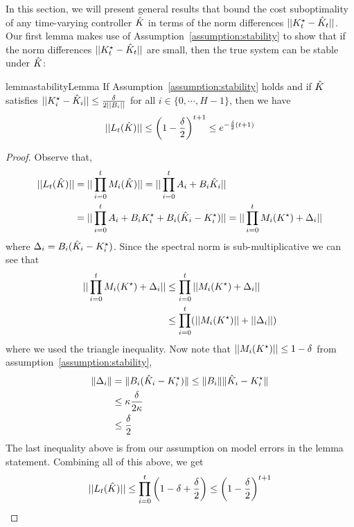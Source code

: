 In this section, we will present general results that bound the cost suboptimality of
any time-varying controller $\hat{K}$ in terms of the norm differences
$||K^\star_{t} - \hat{K}_{t}||$. Our first lemma makes use of
Assumption~\ref{assumption:stability} to show that if the norm differences
$||K^\star_{t} - \hat{K}_{t}||$ are small, then the true system can be stable under
$\hat{K}$:
\begin{restatable}{lemma}{stabilityLemma}
  \label{lemma:stability}
  If Assumption~\ref{assumption:stability} holds and if $\hat{K}$ satisfies
  $||K^\star_{i} - \hat{K}_{i}|| \le \frac{\delta}{2||B_{i}||}$ for all
  $i \in \{0, \cdots, H-1\}$, then we have
  \begin{equation}
    \label{eq:1}
    ||L_{t}(\hat{K})|| \leq \left(1 - \frac{\delta}{2}\right)^{t+1} \leq e^{-\frac{\delta}{2}(t+1)}
  \end{equation}
\end{restatable}
\begin{proof}
  Observe that,
\begin{align*}
  ||L_t(\hat{K})|| &= ||\prod_{i=0}^t M_i(\hat{K})|| = ||\prod_{i=0}^t A_i
                   + B_i\hat{K}_i|| \\
  &= ||\prod_{i=0}^t A_i + B_iK^\star_i + B_i(\hat{K}_i - K^\star_i)|| =
    ||\prod_{i=0}^t M_i(K^\star) + \Delta_i||
\end{align*}
where $\Delta_i = B_i(\hat{K}_i - K^\star_i)$. Since the spectral norm is
sub-multiplicative we can see that
\begin{align*}
  ||\prod_{i=0}^t M_i(K^\star) + \Delta_i|| &\leq \prod_{i=0}^t||M_i(K^\star) +
                                        \Delta_i|| \\
  &\leq \prod_{i=0}^t(||M_i(K^\star)|| + ||\Delta_i||)
\end{align*}
where we used the triangle inequality. Now note that
$||M_i(K^\star)|| \leq 1-\delta$ from assumption~\ref{assumption:stability},
\begin{align*}
  \|\Delta_{i}\| &= \|B_{i}(\hat{K}_{i} - K^\star_{i}) \| \leq \|B_{i}\|\|\hat{K}_{i} - K^\star_{i}\| \\
                 &\leq \kappa \frac{\delta}{2\kappa} \\
  &\leq \frac{\delta}{2}
\end{align*}
The last inequality above is from our assumption on model errors in the lemma statement.
Combining all of this above, we get
\begin{align*}
  ||L_t(\hat{K})|| \leq \prod_{i=0}^t\left(1 - \delta + \frac{\delta}{2}\right) \leq \left( 1-\frac{\delta}{2} \right)^{t+1}
\end{align*}
\end{proof}

